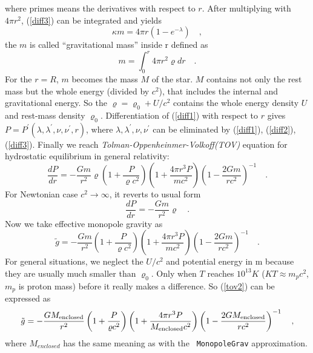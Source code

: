 where primes means the derivatives with respect to $r$. After
multiplying with $4\pi r^2$, (\ref{diff3}) can be integrated and
yields
\begin{equation}\label{gmass1}
  \kappa m = 4\pi r (1-e^{-\lambda}) \quad ,
\end{equation}
the $m$ is called ``gravitational mass'' inside r defined as
\begin{equation}\label{gmass2}
  m = \int_{0}^{r}4\pi r^{2}  \varrho dr\quad .
\end{equation}
For the $r = R$, $m$ becomes the mass $M$ of the star. $M$ contains
not only the rest mass but the whole energy (divided by $c^2$), that
includes the internal and gravitational energy. So the $\varrho =
\varrho_0 +U/c^2$ contains the whole energy density $U$ and rest-mass
density $\varrho_0$.  Differentiation of (\ref{diff1}) with respect to
$r$ gives $P = P^{\prime}(\lambda,\lambda^{\prime},
\nu,\nu^{\prime},r)$, where
$\lambda,\lambda^{\prime},\nu,\nu^{\prime}$ can be eliminated by
(\ref{diff1}), (\ref{diff2}), (\ref{diff3}). Finally we reach
\textit{Tolman-Oppenheinmer-Volkoff(TOV)} equation for hydrostatic
equilibrium in general relativity:
\begin{equation}\label{tov}
  \frac{dP}{dr} = -\frac{Gm}{r^{2}}\varrho \left (1+\frac{P}{\varrho
    c^{2}}\right )\left (1+\frac{4\pi r^3 P}{m c^{2}}\right ) \left (1-\frac{2Gm}{r c^{2}} \right)^{-1} \quad .
\end{equation}
For Newtonian case $c^2 \rightarrow  \infty $, it reverts to usual form
\begin{equation}\label{newton}
  \frac{dP}{dr} = -\frac{Gm}{r^{2}}\varrho \quad .
\end{equation}
Now we take effective monopole gravity as
\begin{equation}\label{tov2}
\tilde{g} = -\frac{Gm}{r^{2}} (1+\frac{P}{\varrho
  c^{2}})(1+\frac{4\pi r^3 P}{m c^{2}}) (1-\frac{2Gm}{r c^{2}})^{-1}  \quad .
\end{equation}
For general situations, we neglect the $U/c^2$ and potential energy in
m because they are usually much smaller than $\varrho_0$. Only when
$T$ reaches $10^{13} K$ ($KT \approx m_{p} c^2$, $m_p$ is proton mass)
before it really makes a difference. So (\ref{tov2}) can be expressed
as
\begin{equation}\label{tov3}
  \tilde{g} = -\frac{GM_{\rm enclosed}}{r^{2}} \left (1+\frac{P}{\varrho
    c^{2}} \right )\left (1+\frac{4\pi r^3 P}{M_{\rm enclosed} c^{2}} \right ) \left (1-\frac{2GM_{\rm enclosed}}{r c^{2}} \right )^{-1} \quad ,
\end{equation}
where $M_{enclosed}$ has the same meaning as with the {\tt
  MonopoleGrav} approximation.



